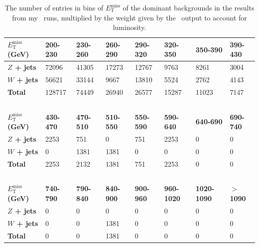 \begin{table}[H]
\centering
    \begin{tabular}{|l|lllllll|}
    \hline
    
    \textbf{$E_{\mathrm{T}}^{\mathrm{miss}}$ (GeV)}       & \textbf{200-230} & \textbf{230-260} & \textbf{260-290}  & \textbf{290-320} & \textbf{320-350}  & \textbf{350-390}  & \textbf{390-430} \\ \hline
    
    \textbf{$Z$ + jets} & 72096   & 41305   & 17273    & 12767   & 9763     & 8261      & 3004    \\ \hline
    \textbf{$W$ + jets} & 56621   & 33144   & 9667    & 13810    & 5524     & 2762      & 4143    \\ \hline
    \textbf{Total}        & 128717  & 74449   & 26940    & 26577 & 15287  & 11023    & 7147  \\ \hline
    
    ~            & ~       & ~       & ~        & ~       & ~        & ~         & ~       \\ \hline
    
    \textbf{$E_{\mathrm{T}}^{\mathrm{miss}}$ (GeV)}      & \textbf{430-470} & \textbf{470-510} & \textbf{510-550}  & \textbf{550-590} & \textbf{590-640}  & \textbf{640-690}   & \textbf{690-740} \\ \hline
    
    \textbf{$Z$ + jets}  & 2253    & 751    & 0      & 751     & 2253      & 0       & 0     \\ \hline
    \textbf{$W$ + jets} & 0     & 1381     & 1381      & 0     & 0      & 0        & 0    \\ \hline
    \textbf{Total}        & 2253  & 2132  & 1381 & 751 & 2253  & 0   & 0 \\ \hline
    
    ~            & ~       & ~       & ~        & ~       & ~        & ~         & ~       \\ \hline
    
    \textbf{$E_{\mathrm{T}}^{\mathrm{miss}}$ (GeV)}      & \textbf{740-790} & \textbf{790-840} & \textbf{840-900}  & \textbf{900-960} & \textbf{960-1020} & \textbf{1020-1090} & \textbf{$>$1090}   \\ \hline
    
    \textbf{$Z$ + jets}  & 0    & 0    & 0    & 0      & 0     & 0        & 0    \\ \hline
    \textbf{$W$ + jets} & 0    & 0    & 1381     & 0     & 0      & 0       & 0     \\ \hline
    \textbf{Total}        & 0 & 0  & 1381   & 0  & 0   & 0    & 0  \\ \hline
    \end{tabular}
    \caption{The number of entries in bins of $E_{\mathrm{T}}^{\mathrm{miss}}$ of the dominant backgrounds in the results from my \madgraph\ runs, multiplied by the weight given by the \madanalysis\ output to account for luminosity.}
    \label{tab:mybkgs200kevnt}
\end{table}

